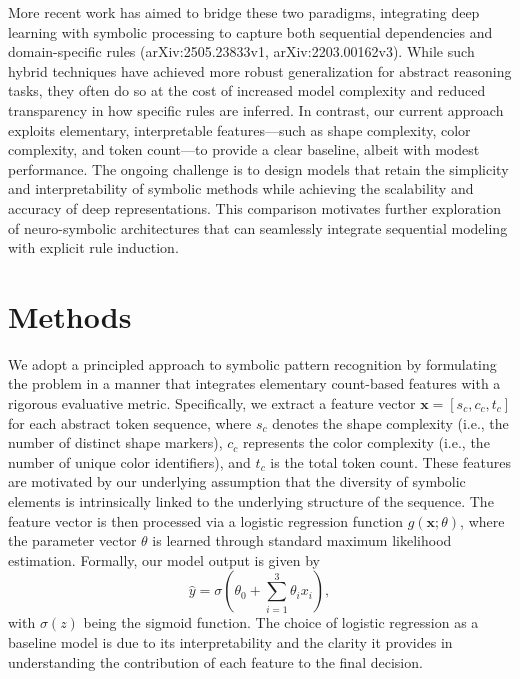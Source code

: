 \documentclass{article}
\begin{document}
More recent work has aimed to bridge these two paradigms, integrating deep learning with symbolic processing to capture both sequential dependencies and domain-specific rules (arXiv:2505.23833v1, arXiv:2203.00162v3). While such hybrid techniques have achieved more robust generalization for abstract reasoning tasks, they often do so at the cost of increased model complexity and reduced transparency in how specific rules are inferred. In contrast, our current approach exploits elementary, interpretable features—such as shape complexity, color complexity, and token count—to provide a clear baseline, albeit with modest performance. The ongoing challenge is to design models that retain the simplicity and interpretability of symbolic methods while achieving the scalability and accuracy of deep representations. This comparison motivates further exploration of neuro-symbolic architectures that can seamlessly integrate sequential modeling with explicit rule induction.

\section{Methods}
We adopt a principled approach to symbolic pattern recognition by formulating the problem in a manner that integrates elementary count-based features with a rigorous evaluative metric. Specifically, we extract a feature vector \( \mathbf{x} = [s_c, c_c, t_c] \) for each abstract token sequence, where \( s_c \) denotes the shape complexity (i.e., the number of distinct shape markers), \( c_c \) represents the color complexity (i.e., the number of unique color identifiers), and \( t_c \) is the total token count. These features are motivated by our underlying assumption that the diversity of symbolic elements is intrinsically linked to the underlying structure of the sequence. The feature vector is then processed via a logistic regression function \( g(\mathbf{x};\theta) \), where the parameter vector \( \theta \) is learned through standard maximum likelihood estimation. Formally, our model output is given by 
\[
\hat{y} = \sigma\left( \theta_0 + \sum_{i=1}^{3} \theta_i x_i \right),
\]
with \(\sigma(z)\) being the sigmoid function. The choice of logistic regression as a baseline model is due to its interpretability and the clarity it provides in understanding the contribution of each feature to the final decision.
\end{document}
